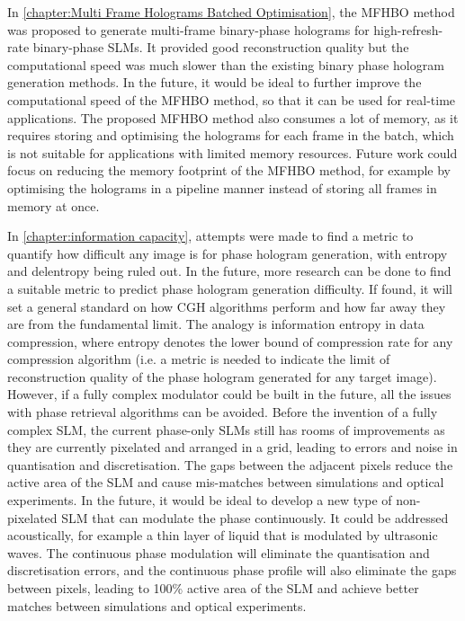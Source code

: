 In \cref{chapter:Multi Frame Holograms Batched Optimisation}, the MFHBO method was proposed to generate multi-frame binary-phase holograms for high-refresh-rate binary-phase SLMs. It provided good reconstruction quality but the computational speed was much slower than the existing binary phase hologram generation methods. In the future, it would be ideal to further improve the computational speed of the MFHBO method, so that it can be used for real-time applications. The proposed MFHBO method also consumes a lot of memory, as it requires storing and optimising the holograms for each frame in the batch, which is not suitable for applications with limited memory resources. Future work could focus on reducing the memory footprint of the MFHBO method, for example by optimising the holograms in a pipeline manner instead of storing all frames in memory at once.

In \cref{chapter:information capacity}, attempts were made to find a metric to quantify how difficult any image is for phase hologram generation, with entropy and delentropy being ruled out. In the future, more research can be done to find a suitable metric to predict phase hologram generation difficulty. If found, it will set a general standard on how CGH algorithms perform and how far away they are from the fundamental limit. The analogy is information entropy in data compression, where entropy denotes the lower bound of compression rate for any compression algorithm (i.e. a metric is needed to indicate the limit of reconstruction quality of the phase hologram generated for any target image). However, if a fully complex modulator could be built in the future, all the issues with phase retrieval algorithms can be avoided. Before the invention of a fully complex SLM, the current phase-only SLMs still has rooms of improvements as they are currently pixelated and arranged in a grid, leading to errors and noise in quantisation and discretisation. The gaps between the adjacent pixels reduce the active area of the SLM and cause mis-matches between simulations and optical experiments. In the future, it would be ideal to develop a new type of non-pixelated SLM that can modulate the phase continuously. It could be addressed acoustically, for example a thin layer of liquid that is modulated by ultrasonic waves. The continuous phase modulation will eliminate the quantisation and discretisation errors, and the continuous phase profile will also eliminate the gaps between pixels, leading to 100\% active area of the SLM and achieve better matches between simulations and optical experiments.